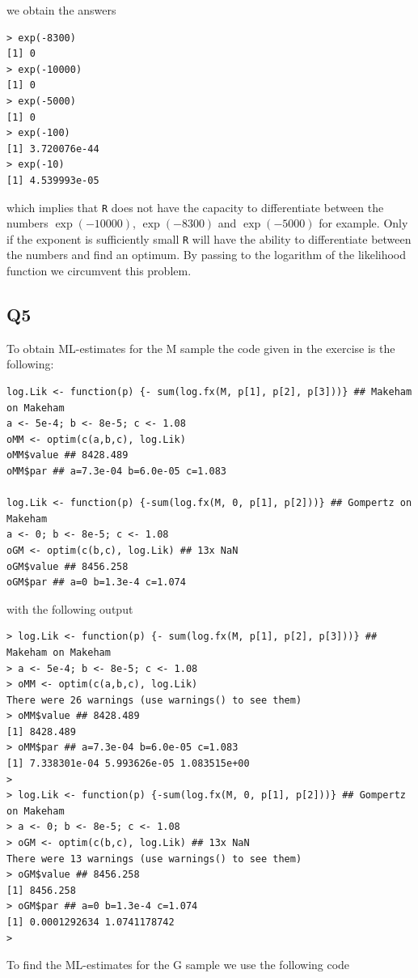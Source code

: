 we obtain the answers

\begin{verbatim}
> exp(-8300)
[1] 0
> exp(-10000)
[1] 0
> exp(-5000)
[1] 0
> exp(-100)
[1] 3.720076e-44
> exp(-10)
[1] 4.539993e-05
\end{verbatim}

which implies that \verb|R| does not have the capacity to differentiate between the numbers $\exp{(-10000)}$, $\exp{(-8300)}$ and $\exp{(-5000)}$ for example. Only if the exponent is sufficiently small \verb|R| will have the ability to differentiate between the numbers and find an optimum. By passing to the logarithm of the likelihood function we circumvent this problem. 


\subsection*{Q5}

To obtain ML-estimates for the M sample the code given in the exercise is the following:
\begin{verbatim}
log.Lik <- function(p) {- sum(log.fx(M, p[1], p[2], p[3]))} ## Makeham on Makeham
a <- 5e-4; b <- 8e-5; c <- 1.08
oMM <- optim(c(a,b,c), log.Lik) 
oMM$value ## 8428.489
oMM$par ## a=7.3e-04 b=6.0e-05 c=1.083

log.Lik <- function(p) {-sum(log.fx(M, 0, p[1], p[2]))} ## Gompertz on Makeham
a <- 0; b <- 8e-5; c <- 1.08
oGM <- optim(c(b,c), log.Lik) ## 13x NaN
oGM$value ## 8456.258
oGM$par ## a=0 b=1.3e-4 c=1.074

\end{verbatim}

with the following output

\begin{verbatim}
> log.Lik <- function(p) {- sum(log.fx(M, p[1], p[2], p[3]))} ## Makeham on Makeham
> a <- 5e-4; b <- 8e-5; c <- 1.08
> oMM <- optim(c(a,b,c), log.Lik) 
There were 26 warnings (use warnings() to see them)
> oMM$value ## 8428.489
[1] 8428.489
> oMM$par ## a=7.3e-04 b=6.0e-05 c=1.083
[1] 7.338301e-04 5.993626e-05 1.083515e+00
> 
> log.Lik <- function(p) {-sum(log.fx(M, 0, p[1], p[2]))} ## Gompertz on Makeham
> a <- 0; b <- 8e-5; c <- 1.08
> oGM <- optim(c(b,c), log.Lik) ## 13x NaN
There were 13 warnings (use warnings() to see them)
> oGM$value ## 8456.258
[1] 8456.258
> oGM$par ## a=0 b=1.3e-4 c=1.074
[1] 0.0001292634 1.0741178742
> 
\end{verbatim}

To find the ML-estimates for the G sample we use the following code

